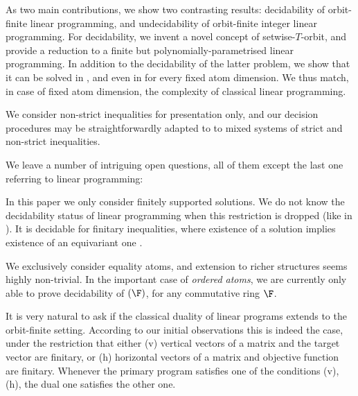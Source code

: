 As two main contributions, we show two contrasting results:
decidability of orbit-finite linear programming, and 
undecidability of orbit-finite integer linear programming.
For decidability, we invent a novel concept of setwise-$T$-orbit, and provide a reduction
to a finite but polynomially-parametrised linear programming.
%
In addition to the decidability of the latter problem,
we show that it can be solved in \EXPTIME, and even in \PTIME for every fixed atom dimension. 
We thus match, in case of fixed atom dimension, the complexity of classical linear programming.

We consider non-strict inequalities for presentation only, 
and our decision procedures
may be straightforwardly adapted to to mixed systems of strict and non-strict inequalities.

We leave a number of intriguing open questions, all of them except the last one referring to
linear programming:

\begin{question}
In this paper we only consider finitely supported solutions.
We do not know the decidability status of %
linear programming when this restriction is dropped
(like in \cite{KKOT15}).
It is decidable for finitary inequalities, where existence of a solution implies existence of an equivariant one \cite{szymon-oral}.
\end{question}

\begin{question}
We exclusively consider equality atoms, and
extension to richer structures seems highly non-trivial.
In the important case of \emph{ordered atoms},
we are currently only able to prove decidability of 
\solvname$(\F)$, for any commutative ring $\F$.
\end{question}

\begin{question}
It is very natural to ask if the classical duality of linear programs extends to the orbit-finite setting.
According to our initial observations this is indeed the case, under the restriction that either 
(v) vertical vectors of a matrix and the target vector are finitary, or
(h) horizontal vectors of a matrix and objective function are finitary. 
Whenever the primary program satisfies one of the conditions (v), (h), the dual one satisfies the other one.
\end{question}

